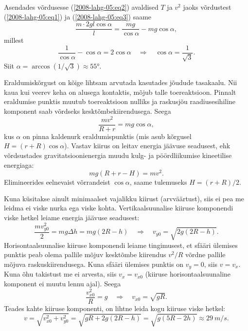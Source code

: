 \documentclass[10pt, twoside]{article}
\begin{document}
{Asendades võrdusesse (\ref{2008-lahg-05:eq2}) avaldised $T$ ja $v^2$
jaoks võrdustest (\ref{2008-lahg-05:eq1}) ja (\ref{2008-lahg-05:eq3}) saame
\[
\frac{m \cdot 2 g l \cos \alpha}{l}=\frac{m g}{\cos \alpha}-m g \cos \alpha,
\]
millest
\[
\frac{1}{\cos \alpha}-\cos \alpha=2 \cos \alpha \quad \Rightarrow\quad \cos \alpha=\frac{1}{\sqrt{3}}.
\]
Siit $\alpha = \arccos \left( 1/ \sqrt 3\right) \approx \ang{55}$.
\probend
\bigskip


\solu
Eraldumiskõrgust on kõige lihtsam arvutada kasutades jõudude tasakaalu. 
Nii kaua kui veerev keha on alusega kontaktis, mõjub talle toereaktsioon. 
Pinnalt eraldumise punktis muutub toereaktsioon nulliks ja raskusjõu raadiusesihiline 
komponent saab võrdseks kesktõmbekiirendusega. Seega
\[
\frac{mv^2}{R+r}=mg\cos\alpha,
\]
kus $\alpha$ on pinna kaldenurk eraldumispunktis (mis asub kõrgusel $H=(r+R)\cos\alpha$). 
Vastav kiirus on leitav energia jäävuse seadusest, ehk
võrdsustades gravitatsioonienergia muudu kulg- ja pöördliikumise kineetilise energiaga:
\[
mg(R+r-H)=mv^2.
\]
Elimineerides eelnevaist võrrandeist $\cos\alpha$, saame tulemuseks $H=(r+R)/2$.
\probend
\bigskip


\solu
Kuna küsitakse ainult minimaalset vajalikku kiirust (arvväärtust), siis ei pea me leidma ei viske nurka ega viske kohta. Vertikaalsuunalise kiiruse komponendi viske hetkel leiame energia jäävuse seadusest:
\[
\frac{m v_{y 0}^{2}}{2}=m g \Delta h=m g(2 R-h) \quad \Rightarrow \quad v_{y 0}=\sqrt{2 g(2 R-h)}.
\]
Horisontaalsuunalise kiiruse komponendi leiame tingimusest, et sfääri ülemises punktis peab olema pallile mõjuv kesktõmbe kiirendus $v^2/R$ võrdne pallile mõjuva raskuskiirendusega. Kuna sfääri ülemises punktis on $v_y = 0$, siis $v = v_x$. Kuna õhu takistust me ei arvesta, siis $v_x = v_{x0}$ (kiiruse horisontaalsuunaline komponent ei muutu lennu ajal). Seega
\[
\frac{v_{x 0}^{2}}{R}=g \quad \Rightarrow \quad v_{x 0}=\sqrt{g R}.
\]
Teades kahte kiiruse komponenti, on lihtne leida kogu kiiruse viske hetkel:
\[
v=\sqrt{v_{x 0}^{2}+v_{y 0}^{2}}=\sqrt{g R+2 g(2 R-h)}=\sqrt{g(5 R-2 h)} \approx \SI{29}{m/s}.
\]

\vspace{0.5\baselineskip}

}
\end{document}
